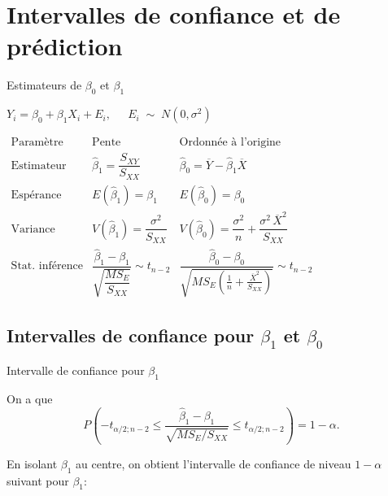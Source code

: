 \documentclass{BeamerTemplate}
\begin{document}
\section[Intervalles]{Intervalles de confiance et de prédiction}


\begin{frame}[t]{Estimateurs de $\beta_0$ et $\beta_1$}

\centerline{$Y_i=\beta_0+\beta_1X_i+E_i,\ \ \quad E_i\;\sim\;N(0,\sigma^2)$}

\bigskip

{\small

{\renewcommand{\arraystretch}{2}
$\begin{array}{c|c|c}
\text{Paramètre}&\text{Pente}&\text{Ordonnée à l'origine}\\\hline
\text{Estimateur}&\hat{\beta}_1%
=\dfrac{S_{XY}}{S_{XX}}%
&\hat{\beta}_0=\overline{Y}-\hat{\beta}_1\overline{X}\\\hline
\text{Espérance}&E(\hat{\beta}_1)=\beta_1&E(\hat{\beta}_0)=\beta_0\\\hline
\text{Variance}&V(\hat{\beta}_1)=\dfrac{\sigma^2}{S_{XX}}&V(\hat{\beta}_0)=\dfrac{\sigma^2}{n}+\dfrac{\sigma^2\,\overline X^2}{S_{XX}}\\[2mm]\hline
\text{Stat. inférence}& \dfrac{\hat{\beta}_1-\beta_1}{\sqrt{\dfrac{MS_E}{S_{XX}}}}\sim t_{n-2}& \dfrac{\hat{\beta}_0-\beta_0}{\sqrt{MS_E\left(\frac{1}{n}+\frac{\overline{X}^2}{S_{XX}}\right)}}\sim t_{n-2}
\end{array}$
}

}
\end{frame}
\subsection[IC $\beta_1$ et $\beta_0$]{Intervalles de confiance pour $\beta_1$ et $\beta_0$}

\begin{frame}[t]{Intervalle de confiance pour $\beta_1$}

On a que
$$P\left(-t_{\alpha/2;n-2}\le\frac{\hat{\beta}_1-\beta_1}{\sqrt{MS_E/S_{XX}}}\le t_{\alpha/2;n-2}\right)=1-\alpha.$$

En isolant $\beta_1$ au centre, on obtient l'intervalle de confiance de niveau $1-\alpha$  suivant pour
$\beta_1$:
{}
\end{frame}
\end{document}
